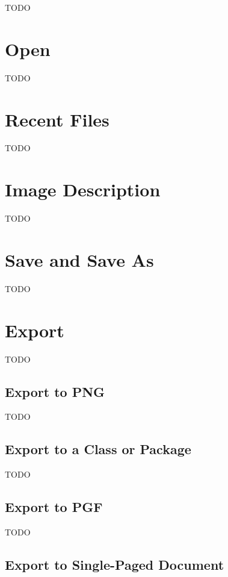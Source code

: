 TODO


\section{Open}\label{sec:loadimage}

TODO

\section{Recent Files}\label{sec:recentfiles}

TODO


\section{Image Description}\label{sec:imagedescription}

TODO


\section{Save and Save As}\label{sec:saveimage}

TODO

\section{Export}\label{sec:exportimage}

TODO


\subsection{Export to PNG}\label{sec:exportpng}

TODO


\subsection{Export to a Class or Package}\label{sec:exportsty}

TODO


\subsection{Export to PGF}\label{sec:exportpgf}

TODO


\subsection{Export to Single-Paged Document}\label{sec:exportdoc}


